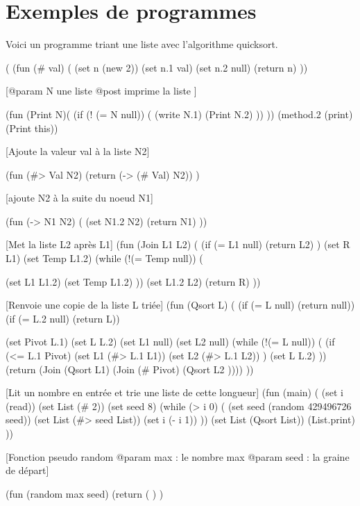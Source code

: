 \section{Exemples de programmes}
	Voici un programme triant une liste avec l'algorithme quicksort. 
	{\small \begin{verbatimtab}
(
	(fun (# val) (
		(set n (new 2))
		(set n.1 val)
		(set n.2 null)
		(return n)
	)) 
	
	[@param N une liste 
	 @post imprime la liste	]

	(fun (Print N)(
		(if (! (= N null)) ( 
			(write N.1)
			(Print N.2)
		))
	))
	(method.2 (print) (Print this))
	
	[Ajoute la valeur val à la liste N2]

	(fun (#> Val N2) 
		(return (-> (# Val) N2)) 
	)
	
	[ajoute N2 à la suite du noeud N1]

	(fun (-> N1 N2) (
		(set N1.2 N2)
		(return N1)
	))
	
	[Met la liste L2 après L1]
	(fun (Join L1 L2) (
		(if (= L1 null) (return L2) )
		(set R L1)
		(set Temp L1.2)
		(while (!(= Temp null)) (
			
			(set L1 L1.2)
			(set Temp L1.2)
		))
		(set L1.2 L2)
		(return R)
	))
	
	[Renvoie une copie de la liste L triée]
	(fun (Qsort L) (
		(if (= L null) (return null))
		(if (= L.2 null) (return L))
			
		(set Pivot L.1)
		(set L L.2)
		(set L1 null)
		(set L2 null)
		(while (!(= L null)) (
		      (if (<= L.1 Pivot) 
				(set L1 (#> L.1 L1))
				(set L2 (#> L.1 L2))
			)
			(set L L.2)
		))
		(return (Join (Qsort L1) (Join (# Pivot) (Qsort L2 ))))
	))

	[Lit un nombre en entrée et trie une liste de cette longueur]
	(fun (main) (
		(set i (read))
		(set List (# 2))
		(set seed 8)
		(while (> i 0) (
			(set seed (random 429496726 seed))
			(set List (#> seed List)) 
			(set i (- i 1))
		))
		(set List (Qsort List))
		(List.print)
	))

	[Fonction pseudo random
	 @param max : le nombre max
	 @param seed : la graine de départ]
		 
	(fun (random max seed)  
		(return (%
	) 
)
	\end{verbatimtab}}
